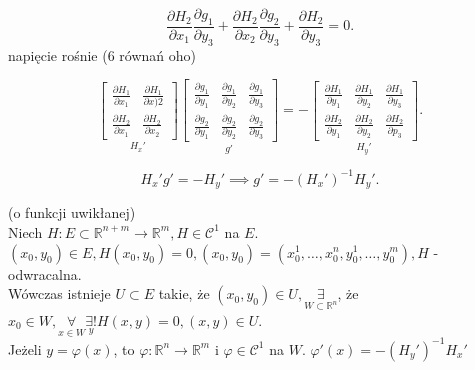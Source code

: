 \documentclass[../main.tex]{subfiles}
\begin{document}
\[
\frac{\partial H_2}{\partial x_1} \frac{\partial g_1}{\partial y_3} +\frac{\partial H_2}{\partial x_2} \frac{\partial g_2}{\partial y_3} +\frac{\partial H_2}{\partial y_3} = 0
.\]
napięcie rośnie (6 równań oho)

\[
    \underset{H_x'}{\begin{bmatrix}
\frac{\partial H_1}{\partial x_1} &\frac{\partial H_1}{\partial x)2} \\
\frac{\partial H_2}{\partial x_1} &\frac{\partial H_2}{\partial x_2} \end{bmatrix}}
\underset{g'}{\begin{bmatrix}
\frac{\partial g_1}{\partial y_1} &\frac{\partial g_1}{\partial y_2} &\frac{\partial g_1}{\partial y_3} \\
\frac{\partial g_2}{\partial y_1} &\frac{\partial g_2}{\partial y_2} &\frac{\partial g_2}{\partial y_3} \end{bmatrix}}
= -
\underset{H_y'}{\begin{bmatrix}
\frac{\partial H_1}{\partial y_1} &\frac{\partial H_1}{\partial y_2} &\frac{\partial H_1}{\partial y_3} \\
\frac{\partial H_2}{\partial y_1} &\frac{\partial H_2}{\partial y_2} &\frac{\partial H_2}{\partial p_3} \end{bmatrix}}
.\]

\[
    H_x' g' = -H_y' \implies g' = -(H_x')^{-1}H_y'
.\]

\begin{tw}
    (o funkcji uwikłanej)\\
    Niech $H:E\subset\mathbb{R}^{n+m}\to\mathbb{R}^{m},H\in\mathcal{C}^{1}$ na $E$. $(x_0,y_0)\in E, H(x_0,y_0)=0, (x_0,y_0) = (x_0^1,\ldots,x_0^n,y_0^1,\ldots,y_0^m), H$ - odwracalna.\\
    Wówczas istnieje  $U\subset E$ takie, że $(x_0,y_0)\in U, \underset{W\subset \mathbb{R}^{n}}{\exists} $, że $x_0\in W, \underset{x\in W}{\forall} \underset{y}{\exists !} H(x,y) = 0, (x,y) \in U$.\\
    Jeżeli $y= \varphi(x)$, to $\varphi:\mathbb{R}^{n}\to\mathbb{R}^{m}$ i $\varphi\in \mathcal{C}^{1}$ na $W$. $\varphi'(x) = -(H_y')^{-1}H_x'$
\end{tw}
\end{document}
